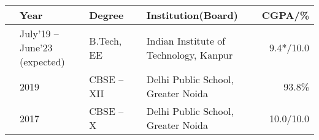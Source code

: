 
\newcommand{\education}[4]{
  & #1 & #2 & &#3 & #4
}
\begin{center}
\begin{tabular}{ | L{0.05cm} l | L{3cm} | L{0.05cm} C{7cm} | r |}
  \hline
  \education{\textbf{Year}}{\textbf{Degree}}{\textbf{Institution(Board)}}{\textbf{CGPA/\%}}\\
  \hline
  \education{July'19 -- June'23 (expected)}{B.Tech, EE}{Indian Institute of Technology, Kanpur}{9.4*/10.0}\\
  \education{2019}{CBSE -- XII}{Delhi Public School, Greater Noida}{93.8\%}\\
  \education{2017}{CBSE -- X}{Delhi Public School, Greater Noida}{10.0/10.0}\\
  \hline
\end{tabular}
\end{center}
\vspace{-4mm}

